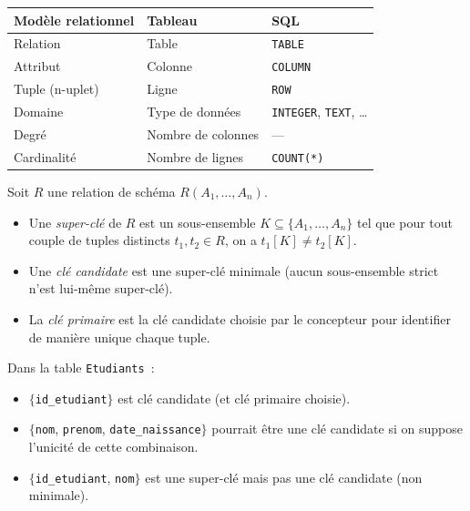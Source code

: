 \begin{formules}[title=\textbf{Terminologie relationnelle vs.\ tabulaire}]
\begin{center}
\begin{tabular}{lll}
\toprule
\textbf{Mod\`ele relationnel} & \textbf{Tableau} & \textbf{SQL} \\
\midrule
Relation & Table & \texttt{TABLE} \\
Attribut & Colonne & \texttt{COLUMN} \\
Tuple (n-uplet) & Ligne & \texttt{ROW} \\
Domaine & Type de donn\'ees & \texttt{INTEGER}, \texttt{TEXT}, \ldots \\
Degr\'e & Nombre de colonnes & --- \\
Cardinalit\'e & Nombre de lignes & \texttt{COUNT(*)} \\
\bottomrule
\end{tabular}
\end{center}
\end{formules}

\begin{definition}
Soit $R$ une relation de sch\'ema $R(A_1, \ldots, A_n)$.
\begin{itemize}
    \item Une \emph{super-cl\'e} de $R$ est un sous-ensemble $K \subseteq \{A_1, \ldots, A_n\}$
          tel que pour tout couple de tuples distincts $t_1, t_2 \in R$, on a $t_1[K] \neq t_2[K]$.
    \item Une \emph{cl\'e candidate} est une super-cl\'e minimale (aucun sous-ensemble strict
          n'est lui-m\^eme super-cl\'e).
    \item La \emph{cl\'e primaire} est la cl\'e candidate choisie par le concepteur pour
          identifier de mani\`ere unique chaque tuple.
\end{itemize}
\end{definition}

\begin{exemple}
Dans la table \texttt{Etudiants}~:
\begin{itemize}
    \item $\{$\texttt{id\_etudiant}$\}$ est cl\'e candidate (et cl\'e primaire choisie).
    \item $\{$\texttt{nom}, \texttt{prenom}, \texttt{date\_naissance}$\}$ pourrait \^etre
          une cl\'e candidate si on suppose l'unicit\'e de cette combinaison.
    \item $\{$\texttt{id\_etudiant}, \texttt{nom}$\}$ est une super-cl\'e mais pas une
          cl\'e candidate (non minimale).
\end{itemize}
\end{exemple}

